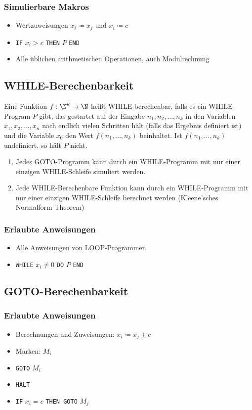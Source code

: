\subsubsection{Simulierbare Makros}
\begin{itemize}
	\item Wertzuweisungen $x_i\coloneqq x_j$ und $x_i\coloneqq c$
	\item \texttt{IF} $x_i>c$ \texttt{THEN} $P$ \texttt{END}
	\item Alle üblichen arithmetischen Operationen, auch Modulrechnung
\end{itemize}

\subsection{WHILE-Berechenbarkeit}\label{sec:while}
Eine Funktion $f:\N^k\rightarrow \N$ heißt WHILE-berechenbar,  falls es ein WHILE-Program $P$ gibt, das gestartet auf der Eingabe $n_1,n_2,\ldots,n_k$ in den Variablen $x_1,x_2,\ldots,x_n$ nach endlich vielen Schritten hält (falls das Ergebnis definiert ist) und die Variable $x_0$ den Wert $f(n_1,\ldots,n_k)$ beinhaltet. Ist $f(n_1,\ldots,n_k)$ undefiniert, so hält $P$ nicht.

\begin{enumerate}
	\item Jedes GOTO-Programm kann durch ein WHILE-Programm mit nur einer einzigen WHILE-Schleife simuliert werden.
	\item Jede WHILE-Berechenbare Funktion kann durch ein WHILE-Programm mit nur einer einzigen WHILE-Schleife berechnet werden (Kleene'sches Normalform-Theorem)
\end{enumerate}

\subsubsection{Erlaubte Anweisungen}
\begin{itemize}
	\item Alle Anweisungen von LOOP-Programmen
	\item \texttt{WHILE} $x_i\neq 0$ \texttt{DO} $P$ \texttt{END}
\end{itemize}


\subsection{GOTO-Berechenbarkeit}\label{sec:goto}
\subsubsection{Erlaubte Anweisungen}
\begin{itemize}
	\item Berechnungen und Zuweisungen: $x_i\coloneqq x_j\pm c$
	\item Marken: $M_i$
	\item \texttt{GOTO} $M_i$
	\item \texttt{HALT}
	\item \texttt{IF} $x_i=c$ \texttt{THEN GOTO} $M_j$
\end{itemize}
